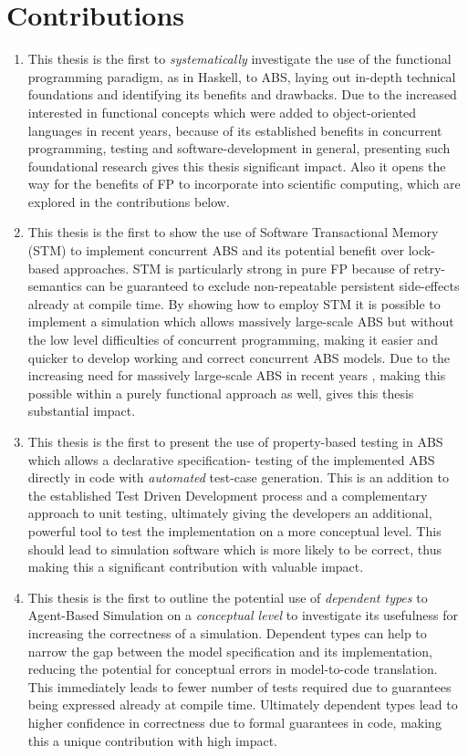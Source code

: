 \newpage

\section{Contributions}
\begin{enumerate}
	\item This thesis is the first to \textit{systematically} investigate the use of the functional programming paradigm, as in Haskell, to ABS, laying out in-depth technical foundations and identifying its benefits and drawbacks. Due to the increased interested in functional concepts which were added to object-oriented languages in recent years, because of its established benefits in concurrent programming, testing and software-development in general, presenting such foundational research gives this thesis significant impact. Also it opens the way for the benefits of FP to incorporate into scientific computing, which are explored in the contributions below.
	
	\item This thesis is the first to show the use of Software Transactional Memory (STM) to implement concurrent ABS and its potential benefit over lock-based approaches. STM is particularly strong in pure FP because of retry-semantics can be guaranteed to exclude non-repeatable persistent side-effects already at compile time. By showing how to employ STM it is possible to implement a simulation which allows massively large-scale ABS but without the low level difficulties of concurrent programming, making it easier and quicker to develop working and correct concurrent ABS models. Due to the increasing need for massively large-scale ABS in recent years \cite{lysenko_framework_2008}, making this possible within a purely functional approach as well, gives this thesis substantial impact.
	
	\item This thesis is the first to present the use of property-based testing in ABS which allows a declarative specification- testing of the implemented ABS directly in code with \textit{automated} test-case generation. This is an addition to the established Test Driven Development process and a complementary approach to unit testing, ultimately giving the developers an additional, powerful tool to test the implementation on a more conceptual level. This should lead to simulation software which is more likely to be correct, thus making this a significant contribution with valuable impact.

	\item This thesis is the first to outline the potential use of \textit{dependent types} to Agent-Based Simulation on a \textit{conceptual level} to investigate its usefulness for increasing the correctness of a simulation. Dependent types can help to narrow the gap between the model specification and its implementation, reducing the potential for conceptual errors in model-to-code translation. This immediately leads to fewer number of tests required due to guarantees being expressed already at compile time. Ultimately dependent types lead to higher confidence in correctness due to formal guarantees in code, making this a unique contribution with high impact.
\end{enumerate}

